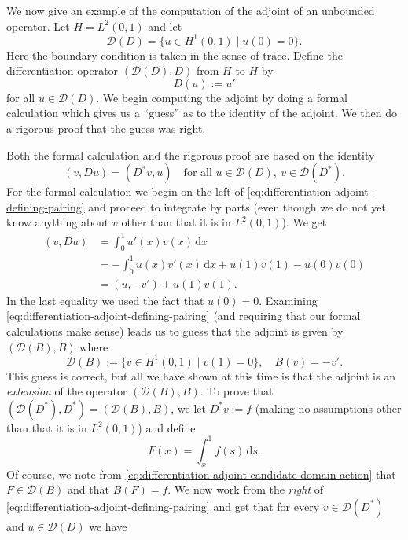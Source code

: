 \begin{Example}
\label{ex:differentiation-hilbert-adjoint-complete-calculation}
We now give an example of the computation of the adjoint of an unbounded operator. Let $H=L^2(0,1)$ and let\[\mathcal{D}(D)=\{u\in H^1(0,1)\mid u(0)=0\}.\]Here the boundary condition is taken in the sense of trace. Define the differentiation operator $(\mathcal{D}(D),D)$ from $H$ to $H$ by\[D(u):=u'\]for all $u\in\mathcal{D}(D)$. We begin computing the adjoint by doing a formal calculation which gives us a ``guess'' as to the identity of the adjoint. We then do a rigorous proof that the guess was right.

Both the formal calculation and the rigorous proof are based on the identity
\begin{equation}\label{eq:differentiation-adjoint-defining-pairing}
(v,Du)=(D^*v,u)\quad\text{for all }u\in\mathcal{D}(D),\ v\in\mathcal{D}(D^*).
\end{equation}
For the formal calculation we begin on the left of \eqref{eq:differentiation-adjoint-defining-pairing} and proceed to integrate by parts (even though we do not yet know anything about $v$ other than that it is in $L^2(0,1)$). We get\[\begin{aligned}
(v,Du)&=\int_0^1u'(x)v(x)\,\mathrm{d}x\\
&=-\int_0^1u(x)v'(x)\,\mathrm{d}x+u(1)v(1)-u(0)v(0)\\
&=(u,-v')+u(1)v(1).
\end{aligned}\]In the last equality we used the fact that $u(0)=0$. Examining \eqref{eq:differentiation-adjoint-defining-pairing} (and requiring that our formal calculations make sense) leads us to guess that the adjoint is given by $(\mathcal{D}(B),B)$ where
\begin{equation}\label{eq:differentiation-adjoint-candidate-domain-action}
\mathcal{D}(B):=\{v\in H^1(0,1)\mid v(1)=0\},\quad B(v)=-v'.
\end{equation}
This guess is correct, but all we have shown at this time is that the adjoint is an \emph{extension} of the operator $(\mathcal{D}(B),B)$. To prove that $(\mathcal{D}(D^*),D^*)=(\mathcal{D}(B),B)$, we let $D^*v:=f$ (making no assumptions other than that it is in $L^2(0,1)$) and define
\begin{equation}\label{eq:differentiation-adjoint-antiderivative}
F(x)=\int_x^1f(s)\,\mathrm{d}s.
\end{equation}
Of course, we note from \eqref{eq:differentiation-adjoint-candidate-domain-action} that $F\in\mathcal{D}(B)$ and that $B(F)=f$. We now work from the \emph{right} of \eqref{eq:differentiation-adjoint-defining-pairing} and get that for every $v\in\mathcal{D}(D^*)$ and $u\in\mathcal{D}(D)$ we have\[\begin{aligned}

\end{aligned}\]
\end{Example}
